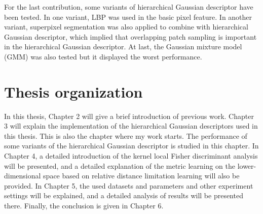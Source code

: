 For the last contribution, some variants of hierarchical Gaussian descriptor have been tested. In one variant, LBP was used in the basic pixel feature. In another variant, superpixel segmentation was also applied to combine with hierarchical Gaussian descriptor, which implied that overlapping patch sampling is important in the hierarchical Gaussian descriptor. At last, the Gaussian mixture model (GMM) was also tested but it displayed the worst performance.

\section{Thesis organization}
In this thesis, Chapter 2 will give a brief introduction of previous work. Chapter 3 will explain the implementation of the hierarchical Gaussian descriptors used in this thesis. This is also the chapter where my work starts. The performance of some variants of the hierarchical Gaussian descriptor is studied in this chapter. In Chapter 4, a detailed introduction of the kernel local Fisher discriminant analysis will be presented, and a detailed explanation of the metric learning on the lower-dimensional space based on relative distance limitation learning will also be provided.
In Chapter 5, the used datasets and parameters and other experiment settings will be explained, and a detailed analysis of results will be presented there. Finally, the conclusion is given in Chapter 6.




